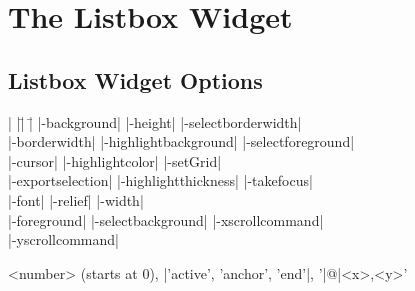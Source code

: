 \section{The Listbox Widget}

\subsection*{Listbox Widget Options}
\begin{tabbing}
|                    |\=|                    |\= \kill                    
|-background|        \> |-height|             \> |-selectborderwidth| \\
|-borderwidth|       \> |-highlightbackground| \> |-selectforeground| \\
|-cursor|	     \> |-highlightcolor|     \> |-setGrid| \\         
|-exportselection|   \> |-highlightthickness| \> |-takefocus| \\
|-font|              \> |-relief|             \> |-width| \\           
|-foreground|        \> |-selectbackground|   \> |-xscrollcommand| \\  
\> \> |-yscrollcommand| \\  
\end{tabbing}

\vskip5pt
\begin{enum}{3cm}


<number> (starts at 0), |'active', 'anchor', 'end'|, '|@|<x>,<y>'

\end{enum}
 
